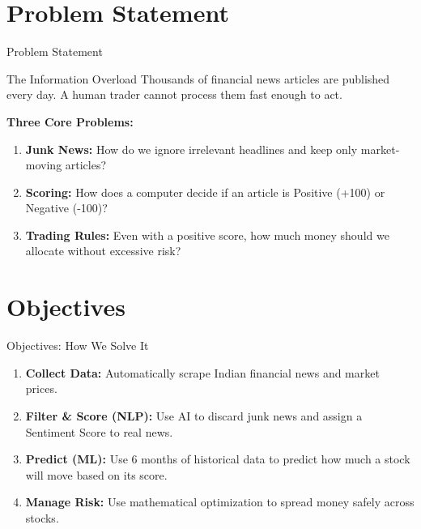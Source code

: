 \documentclass[aspectratio=169, 10pt]{beamer}
\begin{document}
\section{Problem Statement}
\begin{frame}{Problem Statement}
    \begin{block}{The Information Overload}
        Thousands of financial news articles are published every day. A human trader cannot process them fast enough to act.
    \end{block}
    \vspace{0.4em}
    \textbf{Three Core Problems:}
    \begin{enumerate}
        \item \textbf{Junk News:} How do we ignore irrelevant headlines and keep only market-moving articles?
        \item \textbf{Scoring:} How does a computer decide if an article is Positive (+100) or Negative (-100)?
        \item \textbf{Trading Rules:} Even with a positive score, how much money should we allocate without excessive risk?
    \end{enumerate}
\end{frame}

\section{Objectives}
\begin{frame}{Objectives: How We Solve It}
    \begin{enumerate}
        \item \textbf{Collect Data:} Automatically scrape Indian financial news and market prices.
        \item \textbf{Filter \& Score (NLP):} Use AI to discard junk news and assign a Sentiment Score to real news.
        \item \textbf{Predict (ML):} Use 6 months of historical data to predict how much a stock will move based on its score.
        \item \textbf{Manage Risk:} Use mathematical optimization to spread money safely across stocks.
    \end{enumerate}
\end{frame}

\end{document}
